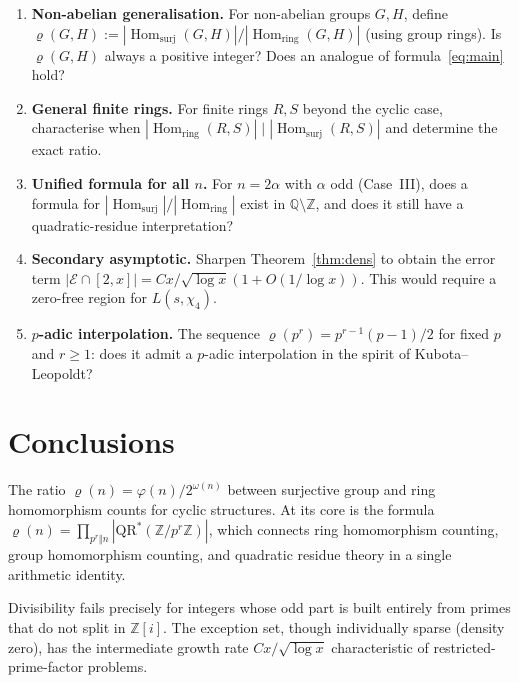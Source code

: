 \documentclass[12pt]{amsart}
\theoremstyle{bluehead}
\theoremstyle{orangehead}
\theoremstyle{greenhead}
\newcommand{\Z}{\mathbb{Z}}
\newcommand{\Q}{\mathbb{Q}}
\newcommand{\QRS}{\mathrm{QR}^{*}}
\newcommand{\Hring}{\operatorname{Hom}_{\mathrm{ring}}}
\newcommand{\Hsurj}{\operatorname{Hom}_{\mathrm{surj}}}
\renewcommand{\phi}{\varphi}
\newcommand{\Exc}{\mathcal{E}}
\begin{document}
\begin{enumerate}[label=\textbf{P\arabic*.},leftmargin=3.5em,topsep=4pt,
                  itemsep=6pt]
  \item \textbf{Non-abelian generalisation.}
    For non-abelian groups $G,H$, define
    $\varrho(G,H):=|\Hsurj(G,H)|/|\Hring(G,H)|$ (using group rings).
    Is $\varrho(G,H)$ always a positive integer?
    Does an analogue of formula~\eqref{eq:main} hold?

  \item \textbf{General finite rings.}
    For finite rings $R,S$ beyond the cyclic case, characterise when
    $|\Hring(R,S)|\mid|\Hsurj(R,S)|$ and determine the exact ratio.

  \item \textbf{Unified formula for all $n$.}
    For $n=2\alpha$ with $\alpha$ odd (Case~III), does a formula for
    $|\Hsurj|/|\Hring|$ exist in $\Q\setminus\Z$, and does it still
    have a quadratic-residue interpretation?

  \item \textbf{Secondary asymptotic.}
    Sharpen Theorem~\ref{thm:dens} to obtain the error term
    $|\Exc\cap[2,x]|=Cx/\sqrt{\log x}(1+O(1/\log x))$.
    This would require a zero-free region for $L(s,\chi_4)$.

  \item \textbf{$p$-adic interpolation.}
    The sequence $\varrho(p^r)=p^{r-1}(p-1)/2$ for fixed $p$
    and $r\ge1$: does it admit a $p$-adic interpolation in the spirit
    of Kubota--Leopoldt?
\end{enumerate}

\section{Conclusions}\label{sec:conc}

The ratio
$\varrho(n)=\phi(n)/2^{\omega(n)}$ between surjective group and ring
homomorphism counts for cyclic structures.  At its core is the formula $\varrho(n)=\prod_{p^r\Vert n}|\QRS(\Z/p^r\Z)|$,
which connects ring homomorphism counting, group homomorphism counting, and
quadratic residue theory in a single arithmetic identity.

Divisibility fails precisely for integers whose odd part is built
entirely from primes that do not split in $\Z[i]$.  The
exception set, though individually sparse (density zero), has the
intermediate growth rate $Cx/\!\sqrt{\log x}$ characteristic of
restricted-prime-factor problems.
\end{document}
